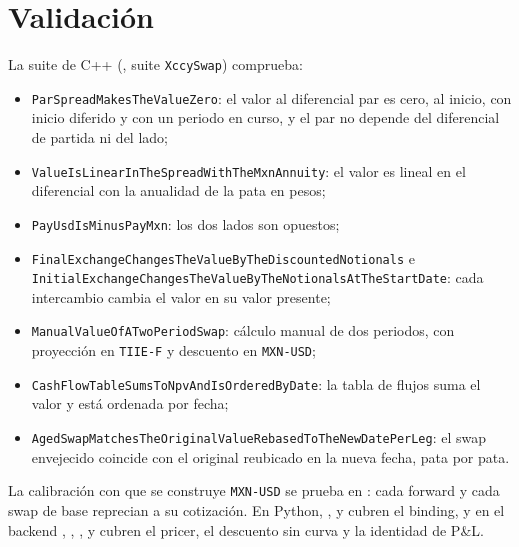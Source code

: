 \section{Validación}\label{sec:cap07-validacion}

La suite de C++ (, suite \texttt{XccySwap}) comprueba:
\begin{itemize}\raggedright
  \item \texttt{ParSpreadMakesTheValueZero}: el valor al diferencial par es cero, al inicio, con inicio diferido y con un periodo en curso, y el par no depende del diferencial de partida ni del lado;
  \item \texttt{ValueIsLinearInTheSpreadWithTheMxnAnnuity}: el valor es lineal en el diferencial con la anualidad de la pata en pesos;
  \item \texttt{PayUsdIsMinusPayMxn}: los dos lados son opuestos;
  \item \texttt{FinalExchangeChangesTheValueByTheDiscountedNotionals} e \texttt{InitialExchangeChangesTheValueByTheNotionalsAtTheStartDate}: cada intercambio cambia el valor en su valor presente;
  \item \texttt{ManualValueOfATwoPeriodSwap}: cálculo manual de dos periodos, con proyección en \texttt{TIIE-F} y descuento en \texttt{MXN-USD};
  \item \texttt{CashFlowTableSumsToNpvAndIsOrderedByDate}: la tabla de flujos suma el valor y está ordenada por fecha;
  \item \texttt{AgedSwapMatchesTheOriginalValueRebasedToTheNewDatePerLeg}: el swap envejecido coincide con el original reubicado en la nueva fecha, pata por pata.
\end{itemize}
La calibración con que se construye \texttt{MXN-USD} se prueba en
: cada forward y cada swap de base reprecian a su
cotización. En Python,
,
 y
 cubren el binding, y en el backend
,
,
,
 y
 cubren el
pricer, el descuento sin curva y la identidad de P\&L.

